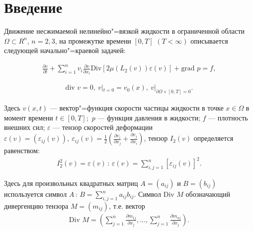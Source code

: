 \documentclass[14pt, a4paper]{extarticle}
\numberwithin{equation}{section}
\begin{document}
    \section{Введение}

    Движение несжимаемой нелинейно"=вязкой жидкости в ограниченной области $\Omega \subset R^n$,
    $n = 2, 3$, на промежутке времени $[0, T]$ $(T < \infty)$ описывается следующей начально"=краевой задачей:

    \begin{equation}\label{eq:1.1}
        \begin{gathered}
            \frac{\partial v}{\partial t} + \sum\limits_{i = 1}^n v_i \frac{\partial v}{\partial x_i} \textrm{Div} [2 \mu (L_2(v)) \varepsilon (v)] + \textrm{grad } p = f,
        \end{gathered}
    \end{equation}

    \begin{equation}\label{eq:1.2}
        \begin{gathered}
            \textrm{div } v = 0, \ v|_{t=0} = v_0(x), \ v|_{\partial\Omega\times[0, T] = 0}.
        \end{gathered}
    \end{equation}

    Здесь $v(x, t)$ --- вектор"=функция скорости частицы жидкости в точке $x \in \Omega$ в момент времени
    $t \in [0, T];$ $p$ --- функция давления в жидкости; $f$ --- плотность внешних сил; $\varepsilon$ --- тензор
    скоростей деформации $\varepsilon(v) = (\varepsilon_{ij}(v)), \ \varepsilon_{ij}(v) = \frac{1}{2} (\frac{\partial v_i}{\partial x_j} + \frac{\partial v_j}{\partial x_i})$,
    тензор $I_2(v)$ определяется равенством:
    \begin{equation*}
        \begin{gathered}
            I_2^2(v) = \varepsilon(v)\, : \,\varepsilon(v) = \sum\limits_{i,j = 1}^n[\varepsilon_{ij}(v)]^2.
        \end{gathered}
    \end{equation*}

    Здесь для произвольных квадратных матриц $A = (a_{ij})$ и $B = (b_{ij})$ используется символ
    $A\, : \,B = \sum_{i,j = 1}^n a_{ij} b_{ij}$. Символ Div $M$ обозначающий дивергенцию тензора
    $M = (m_{ij})$, т.е. вектор
    \begin{equation*}
        \begin{gathered}
            \textrm{Div } M = (\sum\limits_{j = 1}^n \frac{\partial m_{1j}}{\partial x_j}, \ldots, \sum\limits_{j = 1}^n \frac{\partial m_{nj}}{\partial x_j}).
        \end{gathered}
    \end{equation*}
\end{document}
